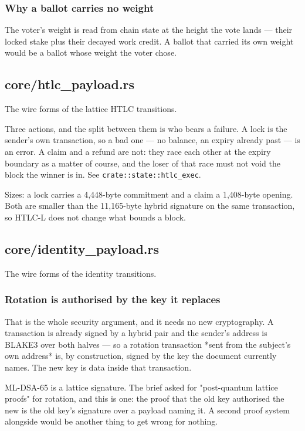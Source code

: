\documentclass[11pt,a4paper]{article}
\begin{document}
\subsubsection{Why a ballot carries no weight}

The voter's weight is read from chain state at the height the vote lands —
their locked stake plus their decayed work credit. A ballot that carried its
own weight would be a ballot whose weight the voter chose.

\subsection{core/htlc\_payload.rs}
The wire forms of the lattice HTLC transitions.

Three actions, and the split between them is who bears a failure. A lock is
the sender's own transaction, so a bad one — no balance, an expiry already
past — is an error. A claim and a refund are not: they race each other at
the expiry boundary as a matter of course, and the loser of that race must
not void the block the winner is in. See \texttt{crate::state::htlc\_exec}.

Sizes: a lock carries a 4,448-byte commitment and a claim a 1,408-byte
opening. Both are smaller than the 11,165-byte hybrid signature on the same
transaction, so HTLC-L does not change what bounds a block.

\subsection{core/identity\_payload.rs}
The wire forms of the identity transitions.

\subsubsection{Rotation is authorised by the key it replaces}

That is the whole security argument, and it needs no new cryptography. A
transaction is already signed by a hybrid pair and the sender's address is
BLAKE3 over both halves — so a rotation transaction *sent from the subject's
own address* is, by construction, signed by the key the document currently
names. The new key is data inside that transaction.

ML-DSA-65 is a lattice signature. The brief asked for "post-quantum lattice
proofs" for rotation, and this is one: the proof that the old key authorised
the new is the old key's signature over a payload naming it. A second proof
system alongside would be another thing to get wrong for nothing.
\end{document}
